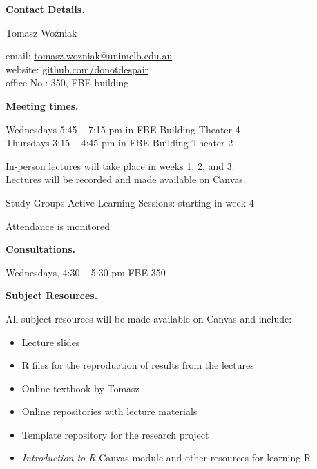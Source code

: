 \documentclass[10pt]{article}
\begin{document}
\bigskip\begin{multicols}{2}

\vspace{0.3cm}\noindent\textbf{Contact Details.} 

\smallskip\indent Tomasz Wo\'zniak 

\smallskip\indent email: \href{mailto:tomasz.wozniak@unimelb.edu.au}{tomasz.wozniak@unimelb.edu.au}\\
\indent website: \href{https://github.com/donotdespair}{github.com/donotdespair}\\
\indent office No.: 350, FBE building


%
%
%

\bigskip\noindent\textbf{Meeting times.}

\smallskip\noindent Wednesdays 5:45 – 7:15 pm in FBE Building Theater 4\\
Thursdays 3:15 – 4:45 pm in FBE Building Theater 2


\bigskip\noindent In-person lectures will take place in weeks 1, 2, and 3.\\
Lectures will be recorded and made available on Canvas.

\smallskip\noindent Study Groups Active Learning Sessions: starting in week 4

\smallskip\noindent Attendance is monitored


\bigskip\noindent\textbf{Consultations.} 

\smallskip\indent Wednesdays, 4:30 -- 5:30 pm FBE 350


\bigskip\noindent\textbf{Subject Resources.}

\smallskip\noindent All subject resources will be made available on Canvas and include:
\begin{itemize}[itemsep=0pt]
\item Lecture slides
\item R files for the reproduction of results from the lectures
\item Online textbook by Tomasz
\item Online repositories with lecture materials
\item Template repository for the research project
\item \textit{Introduction to R} Canvas module and other resources for learning R
\end{itemize}



\end{multicols}
\end{document}
